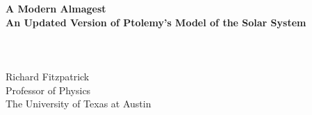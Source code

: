 \documentclass[11pt]{rfbook}
\begin{document}
\thispagestyle{empty}
\begin{center}
{\Huge\bf A Modern Almagest}\\[2ex]
{\Large\bf An Updated  Version of Ptolemy's Model of the Solar System}
~\\
~\\
~\\
~\\
{\Large \sf Richard Fitzpatrick}\\[2ex]
{\Large\sf  Professor  of Physics}\\[2ex]
{\Large\sf  The University of Texas at Austin}\\
~\\
~\\
\end{center}

\pagestyle{fancy}
\renewcommand{\chaptermark}[1]{\markboth{#1}{}}
\fancyhf{}
\fancyhead[LO,RE]{\sl \leftmark}
\fancyhead[LE,RO]{\sl \thepage}

\tableofcontents
\newpage














\end{document}
